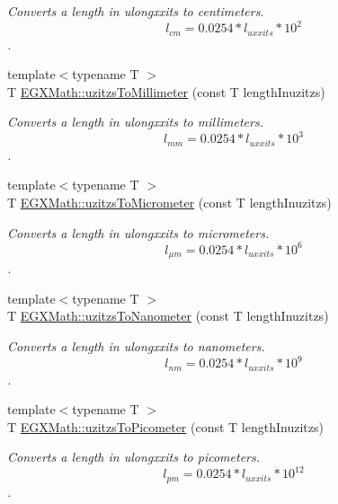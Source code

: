 \begin{DoxyCompactItemize}
\begin{DoxyCompactList}\small\item\em Converts a length in ulongxxits to centimeters. \[ l_{cm}=0.0254 * l_{uxxits} * 10^{2} \]. \end{DoxyCompactList}\item 
{\footnotesize template$<$typename T $>$ }\\T \mbox{\hyperlink{group___e_g_x_math-_conversions-_length_conversions-_imperial-uzitzs-_s_i_gaf507dd646327861da523586b417d132e}{E\+G\+X\+Math\+::uzitzs\+To\+Millimeter}} (const T length\+Inuzitzs)
\begin{DoxyCompactList}\small\item\em Converts a length in ulongxxits to millimeters. \[ l_{mm}=0.0254 * l_{uxxits} * 10^{3} \]. \end{DoxyCompactList}\item 
{\footnotesize template$<$typename T $>$ }\\T \mbox{\hyperlink{group___e_g_x_math-_conversions-_length_conversions-_imperial-uzitzs-_s_i_ga0bd484a80b8b66cd5272bbbc1fe6b642}{E\+G\+X\+Math\+::uzitzs\+To\+Micrometer}} (const T length\+Inuzitzs)
\begin{DoxyCompactList}\small\item\em Converts a length in ulongxxits to micrometers. \[ l_{\mu m}=0.0254 * l_{uxxits} * 10^{6} \]. \end{DoxyCompactList}\item 
{\footnotesize template$<$typename T $>$ }\\T \mbox{\hyperlink{group___e_g_x_math-_conversions-_length_conversions-_imperial-uzitzs-_s_i_ga6c21ffa2ef282d817d349c249eaaa21f}{E\+G\+X\+Math\+::uzitzs\+To\+Nanometer}} (const T length\+Inuzitzs)
\begin{DoxyCompactList}\small\item\em Converts a length in ulongxxits to nanometers. \[ l_{nm}=0.0254 * l_{uxxits} * 10^{9} \]. \end{DoxyCompactList}\item 
{\footnotesize template$<$typename T $>$ }\\T \mbox{\hyperlink{group___e_g_x_math-_conversions-_length_conversions-_imperial-uzitzs-_s_i_ga48c60a4876ac426d1717096263648a4d}{E\+G\+X\+Math\+::uzitzs\+To\+Picometer}} (const T length\+Inuzitzs)
\begin{DoxyCompactList}\small\item\em Converts a length in ulongxxits to picometers. \[ l_{pm}=0.0254 * l_{uxxits} * 10^{12} \]. \end{DoxyCompactList}\item 

\end{DoxyCompactItemize}

